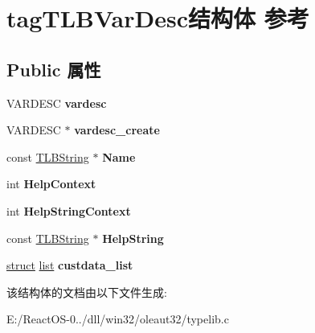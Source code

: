 \hypertarget{structtag_t_l_b_var_desc}{}\section{tag\+T\+L\+B\+Var\+Desc结构体 参考}
\label{structtag_t_l_b_var_desc}
\subsection*{Public 属性}
\begin{DoxyCompactItemize}
\item 
\mbox{\label{structtag_t_l_b_var_desc_a48c3c6b259fbee0a259ed13cd42b8071}} 
V\+A\+R\+D\+E\+SC {\bfseries vardesc}
\item 
\mbox{\label{structtag_t_l_b_var_desc_a3327356fd013cc678fac0310d73ffe43}} 
V\+A\+R\+D\+E\+SC $\ast$ {\bfseries vardesc\+\_\+create}
\item 
\mbox{\label{structtag_t_l_b_var_desc_a758ac94ede7f4440bb7103bfc842fe5f}} 
const \hyperlink{structtag_t_l_b_string}{T\+L\+B\+String} $\ast$ {\bfseries Name}
\item 
\mbox{\label{structtag_t_l_b_var_desc_acd305ed10d44802a33523f635f024b75}} 
int {\bfseries Help\+Context}
\item 
\mbox{\label{structtag_t_l_b_var_desc_a01f77fe4b584228276ad25cada1174fe}} 
int {\bfseries Help\+String\+Context}
\item 
\mbox{\label{structtag_t_l_b_var_desc_a28f0b6fa576a5938338f7f67b4bc079f}} 
const \hyperlink{structtag_t_l_b_string}{T\+L\+B\+String} $\ast$ {\bfseries Help\+String}
\item 
\mbox{\label{structtag_t_l_b_var_desc_a33da95ca4140850548419b339eaa4e67}} 
\hyperlink{interfacestruct}{struct} \hyperlink{classlist}{list} {\bfseries custdata\+\_\+list}
\end{DoxyCompactItemize}


该结构体的文档由以下文件生成\+:\begin{DoxyCompactItemize}
\item 
E\+:/\+React\+O\+S-\/0../dll/win32/oleaut32/typelib.\+c\end{DoxyCompactItemize}
